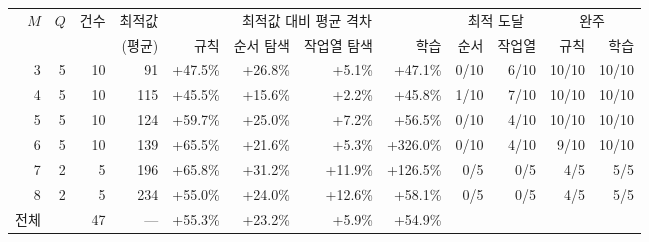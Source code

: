 \begin{tabular}{rrrrrrrrrrrr}
\toprule
$M$ & $Q$ & 건수 & 최적값 & \multicolumn{4}{c}{최적값 대비 평균 격차} & \multicolumn{2}{c}{최적 도달} & \multicolumn{2}{c}{완주} \\
\cmidrule(lr){5-8}\cmidrule(lr){9-10}\cmidrule(lr){11-12}
& & & (평균) & 규칙 & 순서 탐색 & 작업열 탐색 & 학습 & 순서 & 작업열 & 규칙 & 학습 \\
\midrule
3 & 5 & 10 & 91 & +47.5\% & +26.8\% & +5.1\% & +47.1\% & 0/10 & 6/10 & 10/10 & 10/10 \\
4 & 5 & 10 & 115 & +45.5\% & +15.6\% & +2.2\% & +45.8\% & 1/10 & 7/10 & 10/10 & 10/10 \\
5 & 5 & 10 & 124 & +59.7\% & +25.0\% & +7.2\% & +56.5\% & 0/10 & 4/10 & 10/10 & 10/10 \\
6 & 5 & 10 & 139 & +65.5\% & +21.6\% & +5.3\% & +326.0\% & 0/10 & 4/10 & 9/10 & 10/10 \\
7 & 2 & 5 & 196 & +65.8\% & +31.2\% & +11.9\% & +126.5\% & 0/5 & 0/5 & 4/5 & 5/5 \\
8 & 2 & 5 & 234 & +55.0\% & +24.0\% & +12.6\% & +58.1\% & 0/5 & 0/5 & 4/5 & 5/5 \\
\midrule
전체 & & 47 & --- & +55.3\% & +23.2\% & +5.9\% & +54.9\% & & & & \\
\bottomrule
\end{tabular}%
